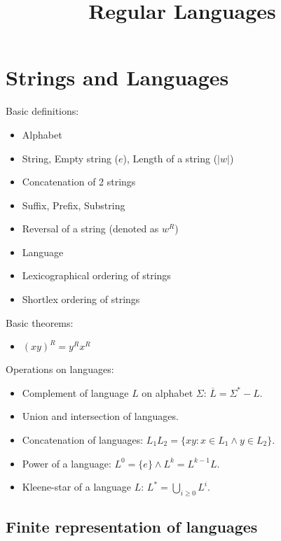 

\title{Regular Languages}



\initAfterBeginDocument{}


\section{Strings and Languages}

Basic definitions:

\begin{itemize}
\item Alphabet
\item String, Empty string ($e$), Length of a string ($|w|$)
\item Concatenation of 2 strings
\item Suffix, Prefix, Substring
\item Reversal of a string (denoted as $w^R$)
\item Language
\item Lexicographical ordering of strings
\item Shortlex ordering of strings
\end{itemize}

Basic theorems:

\begin{itemize}
\item \begin{theorem}$(xy)^R = y^Rx^R$\end{theorem}
\end{itemize}

Operations on languages:

\begin{itemize}
\item Complement of language $L$ on alphabet $\Sigma$:
    $\overline{L} = \Sigma^* - L$.
\item Union and intersection of languages.
\item Concatenation of languages:
    $L_1L_2 = \{xy: x \in L_1 \wedge y \in L_2\}$.
\item Power of a language:
    $L^0 = \{e\} \wedge L^k = L^{k-1}L$.
\item Kleene-star of a language $L$:
    $L^* = \bigcup\limits_{i \ge 0} L^i$.
\end{itemize}

\subsection{Finite representation of languages}

